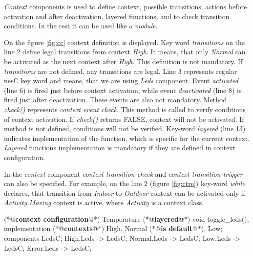 \documentclass{ubicomp-ext}
\begin{document}
\textit{Context} components is used to define context, possible transitions, actions before activation and after deactivation, layered functions, and to check transition conditions. In the rest it can be used like a \textit{module}.

On the figure \ref{fig:cc} context definition is displayed. Key word \textit{transitions} on the line 2 define legal transitions from context \textit{High}. It means, that only \textit{Normal} can be activated as the next context after \textit{High}. This definition is not mandatory. If \textit{transitions} are not defined, any transitions are legal. Line 3 represents regular nesC key word and means, that we are using \textit{Leds} component. Event \textit{activated} (line 6) is fired just before context activation, while event \textit{deactivated} (line 8) is fired just after deactivation. These events are also not mandatory. Method \textit{check()} represents \textit{context event check}. This method is called to verify conditions of context activation. If \textit{check()} returns FALSE, context will not be activated. If method is not defined, conditions will not be verified. Key-word \textit{layered} (line 13) indicates implementation of the function, which is specific for the current context. \textit{Layered} functions implementation is mandatory if they are defined in context configuration.

In the \textit{context} component \textit{context transition check} and \textit{context transition trigger} can also be specified. For example, on the line 2 (figure \ref{fig:ctre}) key-word \textit{while} declares, that transition from \textit{Indoor} to \textit{Outdoor} context can be activated only if \textit{Activity.Moving} context is active, where \textit{Activity} is a context class.

\begin{Sbox}
\begin{minipage}{\marginparwidth}
\begin{csource}
(*@\textbf{context configuration}@*) Temperature {
 (*@\textbf{layered}@*) void toggle_leds();
}
implementation {
 (*@\textbf{contexts}@*) High, 
  Normal (*@\textbf{is default}@*),
  Low;
 components LedsC;
 High.Leds -> LedsC;
 Normal.Leds -> LedsC;
 Low.Leds -> LedsC;
 Error.Leds -> LedsC;
}
\end{csource}
\end{minipage}
\end{Sbox}

\end{document}

